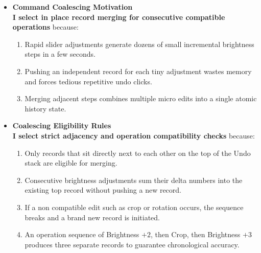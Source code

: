 \documentclass[10pt,a4paper]{article}
\begin{document}
\begin{itemize}[leftmargin=1.2em,noitemsep,topsep=3pt,parsep=2pt]
    \item \textbf{Command Coalescing Motivation}\\[3pt]
    \textbf{I select in place record merging for consecutive compatible operations} because:
    \begin{enumerate}[label=\arabic*),leftmargin=1.5em,noitemsep,topsep=1pt,parsep=1pt]
        \item Rapid slider adjustments generate dozens of small incremental brightness steps in a few seconds.
        \item Pushing an independent record for each tiny adjustment wastes memory and forces tedious repetitive undo clicks.
        \item Merging adjacent steps combines multiple micro edits into a single atomic history state.
    \end{enumerate}

    \item \textbf{Coalescing Eligibility Rules}\\[3pt]
    \textbf{I select strict adjacency and operation compatibility checks} because:
    \begin{enumerate}[label=\arabic*),leftmargin=1.5em,noitemsep,topsep=1pt,parsep=1pt]
        \item Only records that sit directly next to each other on the top of the Undo stack are eligible for merging.
        \item Consecutive brightness adjustments sum their delta numbers into the existing top record without pushing a new record.
        \item If a non compatible edit such as crop or rotation occurs, the sequence breaks and a brand new record is initiated.
        \item An operation sequence of Brightness $+2$, then Crop, then Brightness $+3$ produces three separate records to guarantee chronological accuracy.
    \end{enumerate}


\end{itemize}
\end{document}
